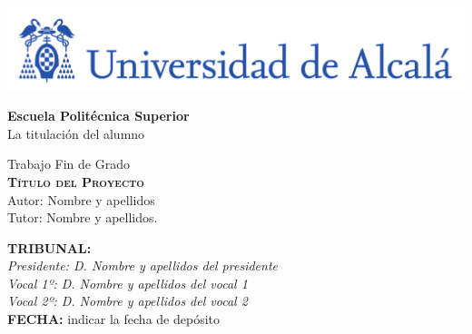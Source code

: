 

\begin{center}

\includegraphics[width=15cm]{figuras/logo-uah.pdf}\\
\vspace{0.5cm}


\LARGE  \textbf{Escuela Politécnica Superior}\\


La titulación del alumno\\
\end{center}

\vspace{0.5cm}



\begin{center}
\vspace{1cm}

\LARGE Trabajo Fin de Grado\\

\textbf{\Huge \textsc{{Título del Proyecto}}}\\
\vspace{0.5cm}
\large Autor: Nombre y apellidos\\
Tutor: Nombre y apellidos.\\
\vspace{0.5cm}
\end{center}

\begin{flushleft}
\textbf{TRIBUNAL:}\\
\vspace{1.5cm}
\textit{Presidente: D. Nombre y apellidos del presidente}\\
\vspace{1.5cm}
\textit{Vocal 1º: D. Nombre y apellidos del vocal 1}\\
\vspace{1.5cm}
\textit{Vocal 2º: D. Nombre y apellidos del vocal 2}\\
\vspace{1.5cm}
\textbf{FECHA:} indicar la fecha de depósito\\ 

\end{flushleft}

\newpage
\thispagestyle{empty}
\hspace*{0.5cm}
\newpage

